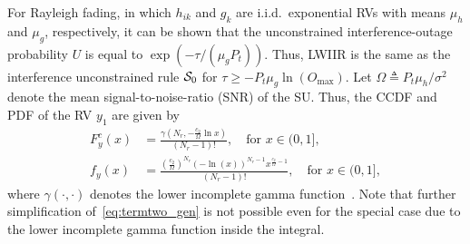 \documentclass[12pt,draftcls,peerreview,onecolumn]{IEEEtran}
\newcommand{\define}{\triangleq}
\newcommand{\mug}{{\mu_{g}}}
\newcommand{\muh}{{\mu_{h}}}
\newcommand{\Nr}{{N_r}}
\newcommand{\Pt}{{P_t}}
\newcommand{\such}{h}
\newcommand{\puch}{g}
\newcommand{\hk}[1]{{\such_{#1}}}
\newcommand{\gk}[1]{{\puch_{#1}}}
\newcommand{\noisevar}{\sigma^2}
\newcommand{\outmax}{O_{\text{max}}}
\newcommand{\itau}{\tau}
\newcommand{\ctwo}{c_{2}}
\newcommand{\yk}[1]{y_{#1}}
\newcommand{\inlccdfg}[1][]{\exp\left({-{{#1}\itau}/{\left( \mug\Pt\right) }}\right)}
\newcommand{\al}{\ctwo}
\newcommand{\snr}{\Omega}
\newcommand{\albysnr}[1][]{\frac{\al#1}{\snr}}
\newcommand{\un}{U}
\newcommand{\caluncons}{{\cal S_{\text{0}}}}
\newcommand{\ccdfyNr}[1]{\frac{\gamma\left(\Nr,-\albysnr\ln{#1}\right)}{(\Nr-1)!}}
\newcommand{\pdfyNr}{\frac{\left(\albysnr\right)^{\Nr}\left(-\ln\left({x}\right)\right)^{\Nr-1}x^{\albysnr[]-1}}{(\Nr-1)!}} %
\newcommand{\pdfyNrgen}[1]{f_{y}\left(#1\right)} %
\newcommand{\ccdfyrv}[1]{ F^{c}_{y}\left(#1 \right) }
\begin{document}
For Rayleigh fading, in which $\hk{ik}$ and $\gk{k}$ are i.i.d.\ exponential RVs with means $\muh$ and $\mug$, respectively, it can be shown that the unconstrained interference-outage probability $\un$ is equal to $\inlccdfg[]$. Thus, LWIIR is the same as the interference unconstrained rule $\caluncons$ for $\itau\geq-\Pt\mug\ln\left(\outmax\right)$.  Let $\snr\define\Pt\muh/\noisevar$ denote the mean signal-to-noise-ratio (SNR) of the SU. Thus, the CCDF and PDF of the RV $\yk{1}$ are given by 
\begin{align}
\label{eq:ccdfyNr}
\ccdfyrv{x} &= \ccdfyNr{x}, \quad \text{for}\,\, x \in (0,1],\\
\label{eq:pdfyNr}
\pdfyNrgen{x} &= \pdfyNr, \quad \text{for}\,\,  x \in (0,1],
\end{align}
where $\gamma(\cdot,\cdot)$ denotes the lower incomplete gamma function~\cite[(8.350.1)]{gradshteyn00_book}. Note that further simplification of~\eqref{eq:termtwo_gen} is not possible even for the special case due to the lower incomplete gamma function inside the integral.  
%
\end{document}
